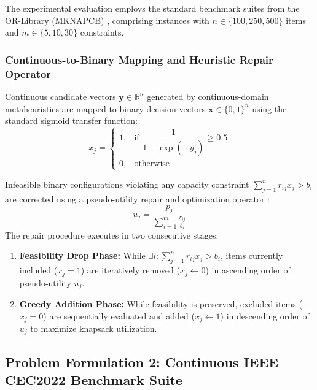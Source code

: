 The experimental evaluation employs the standard benchmark suites from the OR-Library (MKNAPCB) \cite{chu1998genetic}, comprising instances with $n \in \{100, 250, 500\}$ items and $m \in \{5, 10, 30\}$ constraints.

\subsubsection{Continuous-to-Binary Mapping and Heuristic Repair Operator}

Continuous candidate vectors $\mathbf{y} \in \mathbb{R}^n$ generated by continuous-domain metaheuristics are mapped to binary decision vectors $\mathbf{x} \in \{0, 1\}^n$ using the standard sigmoid transfer function:
\begin{equation}
x_j = \begin{cases}
1, & \text{if } \dfrac{1}{1 + \exp(-y_j)} \ge 0.5 \\
0, & \text{otherwise}
\end{cases}
\label{eq:sigmoid_mapping}
\end{equation}

Infeasible binary configurations violating any capacity constraint $\sum_{j=1}^{n} r_{ij} x_j > b_i$ are corrected using a pseudo-utility repair and optimization operator \cite{chu1998genetic}:
\begin{equation}
u_j = \frac{p_j}{\displaystyle\sum_{i=1}^{m} \frac{r_{ij}}{b_i}}
\label{eq:pseudo_utility}
\end{equation}
The repair procedure executes in two consecutive stages:
\begin{enumerate}
    \item \textbf{Feasibility Drop Phase:} While $\exists i : \sum_{j=1}^n r_{ij} x_j > b_i$, items currently included ($x_j = 1$) are iteratively removed ($x_j \leftarrow 0$) in ascending order of pseudo-utility $u_j$.
    \item \textbf{Greedy Addition Phase:} While feasibility is preserved, excluded items ($x_j = 0$) are sequentially evaluated and added ($x_j \leftarrow 1$) in descending order of $u_j$ to maximize knapsack utilization.
\end{enumerate}




\subsection{Problem Formulation 2: Continuous IEEE CEC2022 Benchmark Suite}
\label{sec:cec2022_formulation}

